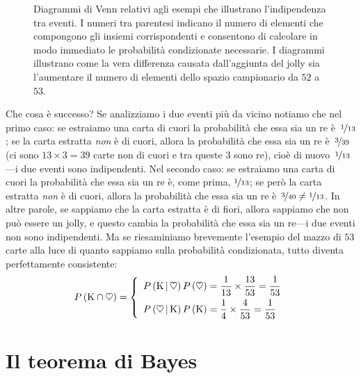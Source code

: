 \begin{figure}
  
  \caption{Diagrammi di Venn relativi agli esempi che illustrano l'indipendenza
    tra eventi. I numeri tra parentesi indicano il numero di elementi che
    compongono gli insiemi corrispondenti e consentono di calcolare in modo
    immediato le probabilità condizionate necessarie.
    I diagrammi illustrano come la vera differenza causata dall'aggiunta del
    jolly sia l'aumentare il numero di elementi dello spazio campionario da
    $52$ a $53$.}
  \label{fig:probabilita_cond_carte_venn}
\end{figure}

Che cosa è successo? Se analizziamo i due eventi più da vicino notiamo
che nel primo caso: se estraiamo una carta di cuori la probabilità che
essa sia un re è~$\nicefrac{1}{13}$; se la carta estratta \emph{non} è
di cuori, allora la probabilità che essa sia un re è~$\nicefrac{3}{39}$
(ci sono $13 \times 3 = 39$ carte non di cuori e tra queste $3$ sono re),
cioè di nuovo~$\nicefrac{1}{13}$---i due eventi sono indipendenti.
Nel secondo caso: se estraiamo una carta di cuori la probabilità che
essa sia un re è, come prima, $\nicefrac{1}{13}$; se però la carta
estratta \emph{non} è di cuori, allora la probabilità che essa sia un re
è~$\nicefrac{3}{40} \neq \nicefrac{1}{13}$. In altre parole, se sappiamo che
la carta estratta è di fiori, allora sappiamo che non può essere un jolly,
e questo cambia la probabilità che essa sia un re---i due eventi non sono
indipendenti. Ma se riesaminiamo brevemente l'esempio del mazzo di $53$ carte
alla luce di quanto sappiamo sulla probabilità condizionata, tutto diventa
perfettamente consistente:
\begin{align*}
  \displaystyle P\left(\text{K} \cap \heartsuit\right) = \left \{ \begin{array}{ll}
    \displaystyle P\left(\text{K} \,|\, \heartsuit\right) \displaystyle P\left(\heartsuit\right) =
    \frac{1}{13}\times\frac{13}{53} = \frac{1}{53}\\[7pt]
    \displaystyle P\left(\heartsuit \,|\, \text{K}\right) \displaystyle P\left(\text{K}\right) =
    \frac{1}{4}\times\frac{4}{53} = \frac{1}{53}\end{array}\right.
\end{align*}


\section{Il teorema di Bayes}
\label{sec:teorema_bayes}

